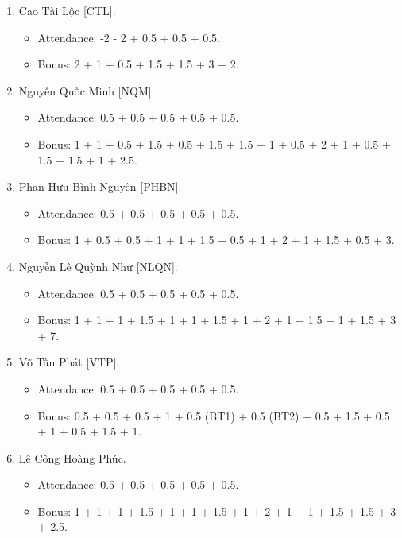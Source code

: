 \documentclass{article}
\begin{document}
\begin{enumerate}
\begin{itemize}
        \item Bonus: 1 + 1 + 1 + 1.5 + 1 + 1 + 2 + 1 + 1 + 1 + 1.5 + 3 + 3.
    \end{itemize}
    \item {\sc Cao Tài Lộc [CTL].}
    \begin{itemize}
        \item Attendance: -2 - 2 + 0.5 + 0.5 + 0.5.
        \item Bonus: 2 + 1 + 0.5 + 1.5 + 1.5 + 3 + 2.
    \end{itemize}
    \item {\sc Nguyễn Quốc Minh [NQM].}
    \begin{itemize}
        \item Attendance: 0.5 + 0.5 + 0.5 + 0.5 + 0.5.
        \item Bonus: 1 + 1 + 0.5 + 1.5 + 0.5 + 1.5 + 1.5 + 1 + 0.5 + 2 + 1 + 0.5 + 1.5 + 1.5 + 1 + 2.5.
    \end{itemize}
    \item {\sc Phan Hữu Bình Nguyên [PHBN].}
    \begin{itemize}
        \item Attendance: 0.5 + 0.5 + 0.5 + 0.5 + 0.5.
        \item Bonus: 1 + 0.5 + 0.5 + 1 + 1 + 1.5 + 0.5 + 1 + 2 + 1 + 1.5 + 0.5 + 3.
    \end{itemize}
    \item {\sc Nguyễn Lê Quỳnh Như [NLQN].}
    \begin{itemize}
        \item Attendance: 0.5 + 0.5 + 0.5 + 0.5 + 0.5.
        \item Bonus: 1 + 1 + 1 + 1.5 + 1 + 1 + 1.5 + 1 + 2 + 1 + 1.5 + 1 + 1.5 + 3 + 7.
    \end{itemize}
    \item {\sc Võ Tấn Phát [VTP].}
    \begin{itemize}
        \item Attendance: 0.5 + 0.5 + 0.5 + 0.5 + 0.5.
        \item Bonus: 0.5 + 0.5 + 0.5 + 1 + 0.5 (BT1) + 0.5 (BT2) + 0.5 + 1.5 + 0.5 + 1 + 0.5 + 1.5 + 1.
    \end{itemize}
    \item {\sc Lê Công Hoàng Phúc.}
    \begin{itemize}
        \item Attendance: 0.5 + 0.5 + 0.5 + 0.5 + 0.5.
        \item Bonus: 1 + 1 + 1 + 1.5 + 1 + 1 + 1.5 + 1 + 2 + 1 + 1 + 1.5 + 1.5 + 3 + 2.5.

\end{itemize}
\end{enumerate}
\end{document}
